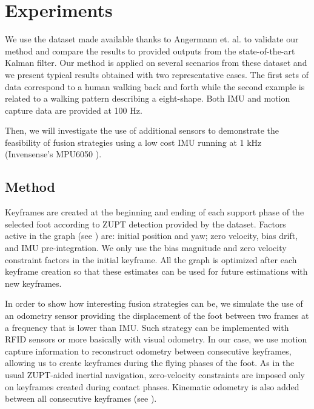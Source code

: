 
\section{Experiments} \label{sec:experiments}

We use the dataset made available thanks to Angermann et. al. \cite{angermann2010high} to validate our method and compare the results to provided outputs from the state-of-the-art Kalman filter.
Our method is applied on several scenarios from these dataset and we present typical results obtained with two representative cases. The first sets of data correspond to a human walking back and forth 
while the second example is related to a walking pattern describing a eight-shape. Both IMU and motion capture data are provided at 100 Hz.

Then, we will investigate the use of additional sensors to demonstrate the feasibility of fusion strategies using a low cost IMU running at 1 kHz (Invensense's MPU6050 \cite{InvenSense}).


\subsection{Method}

Keyframes are created at the beginning and ending of each support phase of the selected foot according to ZUPT detection provided by the dataset. Factors active in the graph (see ) are: initial position and yaw; zero velocity, bias drift, and IMU pre-integration. We only use the bias magnitude 
and zero velocity constraint factors in the initial keyframe. All the graph is optimized after each keyframe creation so that these estimates can be used for future estimations with new keyframes.

In order to show how interesting fusion strategies can be, we simulate the use of an odometry sensor providing the displacement of the foot between two frames at a frequency that is lower than IMU. Such strategy can be implemented with
RFID sensors or more basically with visual odometry. In our case, we use motion capture information to reconstruct odometry between consecutive keyframes, allowing us to create keyframes during the flying phases of the foot. As in the usual ZUPT-aided inertial
navigation, zero-velocity constraints are imposed only on keyframes created during contact phases. Kinematic odometry is also added between all consecutive keyframes (see ).


